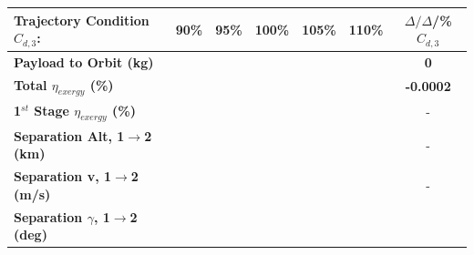 \begin{table}[ht] %
	\centering
	\begin{tabular}{l c c c c c c} 
		\hline \textbf{Trajectory Condition}   \qquad  $C_{d,3}$:
		&90\%
		&95\%
		&100\%
		&105\%
		&110\%
		& $\Delta/\Delta$/\%$C_{d,3}$
			\\
			\hline \textbf{Payload to Orbit (kg)}
			& \textbf{\PayloadToOrbitCdThreeNinetyNoReturn}
			& \textbf{\PayloadToOrbitCdThreeNinetyFiveNoReturn}
			& \textbf{\PayloadToOrbitCdThreeStandardNoReturn}
			& \textbf{\PayloadToOrbitCdThreeOneOneHundredFiveNoReturn}
			& \textbf{\PayloadToOrbitCdThreeOneHundredTenNoReturn}
			& \textbf{0}
			\\
			\textbf{Total $\eta_{exergy}$ (\%)}
			& \textbf{\totalExergyEffCdThreeNinetyNoReturn}
			& \textbf{\totalExergyEffCdThreeNinetyFiveNoReturn}
			& \textbf{\totalExergyEffCdThreeStandardNoReturn}
			& \textbf{\totalExergyEffCdThreeOneOneHundredFiveNoReturn}
			& \textbf{\totalExergyEffCdThreeOneHundredTenNoReturn}
			& \textbf{-0.0002}
			\\
			\hline 
			\textbf{1$^{st}$ Stage $\eta_{exergy}$ (\%)}
			& \textbf{\firstExergyEffCdThreeNinetyNoReturn}
			& \textbf{\firstExergyEffCdThreeNinetyFiveNoReturn}
			& \textbf{\firstExergyEffCdThreeStandardNoReturn}
			& \textbf{\firstExergyEffCdThreeOneOneHundredFiveNoReturn}
			& \textbf{\firstExergyEffCdThreeOneHundredTenNoReturn}
			& -
			\\
			\textbf{Separation Alt, 1$\rightarrow$2 (km)}
			& \firstsecondSeparationAltCdThreeNinetyNoReturn
			& \firstsecondSeparationAltCdThreeNinetyFiveNoReturn
			& \firstsecondSeparationAltCdThreeStandardNoReturn
			& \firstsecondSeparationAltCdThreeOneOneHundredFiveNoReturn
			& \firstsecondSeparationAltCdThreeOneHundredTenNoReturn
			& -
			\\
			\textbf{Separation v, 1$\rightarrow$2 (m/s)}
			& \firstsecondSeparationvCdThreeNinetyNoReturn
			& \firstsecondSeparationvCdThreeNinetyFiveNoReturn
			& \firstsecondSeparationvCdThreeStandardNoReturn
			& \firstsecondSeparationvCdThreeOneOneHundredFiveNoReturn
			& \firstsecondSeparationvCdThreeOneHundredTenNoReturn
			& -
			\\
			\textbf{Separation $\gamma$, 1$\rightarrow$2 (deg)}
			& \firstsecondSeparationgammaCdThreeNinetyNoReturn
			& \firstsecondSeparationgammaCdThreeNinetyFiveNoReturn
			& \firstsecondSeparationgammaCdThreeStandardNoReturn
			& \firstsecondSeparationgammaCdThreeOneOneHundredFiveNoReturn
			& \firstsecondSeparationgammaCdThreeOneHundredTenNoReturn

\end{tabular}
\end{table}
